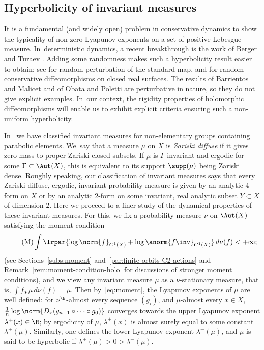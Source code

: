 \subsection{Hyperbolicity of invariant measures} \label{subs:hyperbolicity}

It is a fundamental (and widely open) problem in conservative dynamics to show the typicality of non-zero Lyapunov exponents
on a set of positive Lebesgue measure. In~deterministic dynamics, a recent breakthrough is the work of
Berger and Turaev \cite{berger-turaev}. Adding some randomness makes such a hyperbolicity result easier to obtain:
see \cite{blumenthal-xue-young} for random perturbation of the standard map, and
\cite{barrientos-malicet, obata-poletti}
for random conservative diffeomorphisms on closed real surfaces. The results of Barrientos and Malicet \cite{barrientos-malicet} and of
Obata and Poletti \cite{obata-poletti} are perturbative in nature, so they do not give explicit examples. In~our context, the rigidity properties of holomorphic diffeomorphisms will
enable us to exhibit explicit criteria ensuring such a non-uniform hyperbolicity.

In~\cite{invariant} we have classified
invariant measures for non-elementary groups containing parabolic elements. We~say
that a measure $\mu$ on $X$ is
{\emph{Zariski diffuse}}
if it gives zero mass to proper Zariski closed subsets. If $\mu$ is $\Gamma$-invariant and ergodic for some
$\Gamma\subset \Aut(X)$, this is equivalent to its support $\supp(\mu)$
being Zariski dense. Roughly speaking, our classification of invariant measures says that every Zariski diffuse, ergodic, invariant probability measure is
given by an analytic $4$-form on $X$ or by an analytic $2$-form on some invariant, real analytic subset $Y\subset X$ of dimension $2$.
Here we proceed to a finer study of the dynamical properties of these invariant measures. For this, we
fix a probability measure $\nu$ on $\Aut(X)$ satisfying the moment condition
\begin{equation}\label{eq:moment}
\tag{M}
\int \lrpar{\log\norm{f}_{C^1(X)}+ \log\anorm{f\inv}_{C^1(X)}} \, d\nu (f) < + \infty;
\end{equation}
(see Sections~\ref{subs:moment} and~\ref{par:finite-orbits-C2-actions} and Remark~\ref{rem:moment-condition-holo} for discussions of stronger moment conditions),
and we view any invariant measure $\mu$
as a $\nu$-stationary measure, that is,
$\int f_\varstar\mu \, d\nu(f) = \mu$. Then by~\eqref{eq:moment},
the Lyapunov exponents of $\mu$ are well defined: for $\nu^\N$-almost every sequence $(g_i)$,
and $\mu$-almost every $x\in X$, $\frac{1}{n}\log \norm{D_x(g_{n-1}\circ \cdots \circ g_0)}$ converges towards the upper Lyapunov exponent $\lambda^+(x)\in \R$; by ergodicity of $\mu$, $\lambda^+(x)$ is almost surely equal to some constant $\lambda^+(\mu)$. Similarly, one defines the lower Lyapunov exponent $\lambda^-(\mu)$, and $\mu$ is said to be hyperbolic if $\lambda^+(\mu)>0>\lambda^-(\mu)$.

